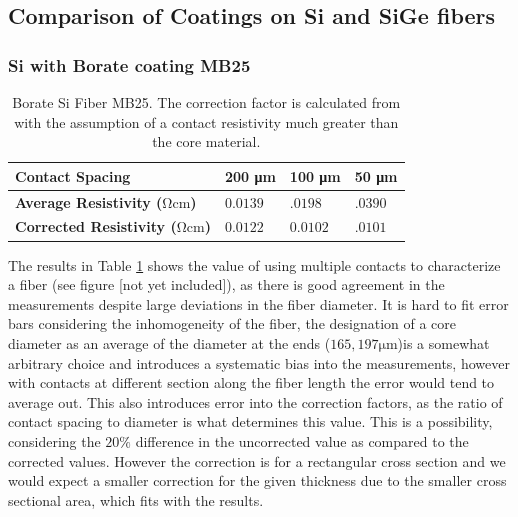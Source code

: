 \subsection{Comparison of Coatings on Si and SiGe fibers}
\subsubsection{Si with Borate coating MB25}

\begin{table}[!h]
\begin{center}
\begin{tabular}{ | l | l | l | l |}
\hline
\textbf{Contact Spacing}&\textbf{200 \si{\micro \meter}} & \textbf{100 \si{\micro \meter}} & \textbf{50 \si{\micro \meter}} \\ \hline
\textbf{Average Resistivity ($\si{\ohm \cm}$)}&$0.0139$& $.0198$&$.0390$\\\hline
\textbf{Corrected Resistivity ($\si{\ohm \cm}$)}&0$.0122$& $0.0102$ &$.0101$\\\hline
\end{tabular}
\end{center}
\caption{Borate Si Fiber MB25. The correction factor is calculated from \cite{Zimney2007CorrectionStudy} with the assumption of a contact resistivity much greater than the core material.}
\label{Tabmb25}
\end{table}

The results in Table \ref{Tabmb25} shows the value of using multiple contacts to characterize a fiber (see figure [not yet included]), as there is good agreement in the measurements despite large deviations in the fiber diameter. It is hard to fit error bars considering the inhomogeneity of the fiber, the designation of a core diameter as an average of the diameter at the ends ($165, 197 \si{\micro\meter}$)is a somewhat arbitrary choice and introduces a systematic bias into the measurements, however with contacts at different section along the fiber length the error would tend to average out. This also introduces error into the correction factors, as the ratio of contact spacing to diameter is what determines this value. This is a possibility, considering the $20\%$ difference in the uncorrected value as compared to the corrected values. However the correction is for a rectangular cross section and we would expect a smaller correction for the given thickness due to the smaller cross sectional area, which fits with the results. 



